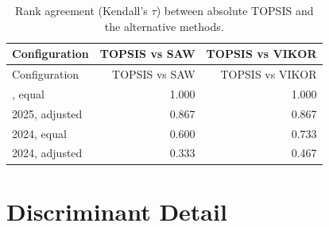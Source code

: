 \documentclass[
  12pt,
  letterpaper,
  12pt,
  oneside,
  english,
  onehalfspacing,
  headsepline]{MastersDoctoralThesis}
\begin{document}
\begin{longtable}[]{@{}lrr@{}}
\caption{Rank agreement (Kendall's \(\tau\)) between absolute TOPSIS and
the alternative
methods.}\label{tbl-appc-convergentabsolute}\tabularnewline
\toprule\noalign{}
Configuration & TOPSIS vs SAW & TOPSIS vs VIKOR \\
\midrule\noalign{}
\endfirsthead
\toprule\noalign{}
Configuration & TOPSIS vs SAW & TOPSIS vs VIKOR \\
\midrule\noalign{}
\endhead
\bottomrule\noalign{}
\endlastfoot
2025, equal & 1.000 & 1.000 \\
2025, adjusted & 0.867 & 0.867 \\
2024, equal & 0.600 & 0.733 \\
2024, adjusted & 0.333 & 0.467 \\
\end{longtable}

\section{Discriminant Detail}\label{discriminant-detail}
\end{document}
